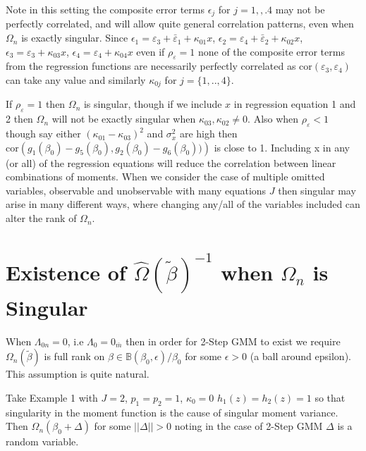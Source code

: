 \documentclass[11pt, fleqn]{article}
\begin{document}
Note in this setting the composite error terms $\epsilon_j$ for $j=1,,.4$ may not be perfectly correlated, and will allow quite general correlation patterns, even when $\Omega_n$ is exactly singular.
 Since $\epsilon_1=\varepsilon_3+\bar{\varepsilon}_1+\kappa_{01}x$, $\epsilon_2=\varepsilon_4+\bar{\varepsilon}_2+\kappa_{02}x$,
$\epsilon_3=\varepsilon_3+\kappa_{03}x$, $\epsilon_4=\varepsilon_4+\kappa_{04}x$ even if  $\rho_{\varepsilon}=1$ none of the composite error terms from the regression functions are necessarily perfectly correlated as $ \textrm{cor}(\varepsilon_3,\varepsilon_4)$  can take any value and similarly $\kappa_{0j}$ for $j=\{1,..,4\}$.

If $\rho_{\varepsilon}=1$ then $\Omega_n$ is singular, though if we include $x$ in regression equation 1 and 2 then $\Omega_n$ will not be exactly singular when $\kappa_{03},\kappa_{02} \neq 0$.  Also when $\rho_{\varepsilon}<1$ though say either $(\kappa_{01}-\kappa_{03})^2$ and $\sigma_x^2$ are high then $ \textrm{cor}\left(g_1(\beta_0)-g_5(\beta_0),g_2(\beta_0)-g_6(\beta_0))\right)$ is close to 1. Including x in any (or all) of the regression equations will reduce the correlation between linear combinations of moments. When we consider the case of multiple omitted variables, observable and unobservable with many equations $J$ then singular may arise in many different ways, where changing any/all of the variables included can alter the rank of $\Omega_n$.






\section*{Existence of $\hat{\Omega}(\tilde{\beta})^{-1}$ when $\Omega_n$ is Singular}


When $\Lambda_{0n}=0$, i.e $\Lambda_0=0_{\bar{m}}$ then in order for 2-Step GMM to exist we require $\Omega_n(\tilde{\beta})$ is full rank on $\beta \in \mathbb{B}(\beta_0,\epsilon)/\beta_0$ for some $\epsilon>0$ (a ball around epsilon). This assumption is quite natural.

Take Example 1 with $J=2$, $p_1=p_2=1$, $\kappa_0=0$ $h_1(z)=h_2(z)=1$ so that singularity in the moment function is  the cause of singular moment variance. Then $\Omega_n(\beta_0+\Delta)$ for some $|\!|\Delta|\!|>0$ noting in the case of 2-Step GMM $\Delta$ is a random variable.\\
\end{document}
